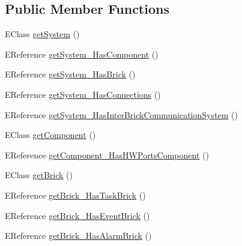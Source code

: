 \subsection*{Public Member Functions}
\begin{DoxyCompactItemize}
\item 
E\-Class \hyperlink{classshootingmachineemfmodel_1_1impl_1_1_shootingmachineemfmodel_package_impl_a79cabfebb9a8de6c66ef4b36772d16d1}{get\-System} ()
\item 
E\-Reference \hyperlink{classshootingmachineemfmodel_1_1impl_1_1_shootingmachineemfmodel_package_impl_abf594d9c3cb58e015ec7c686fb1353d0}{get\-System\-\_\-\-Has\-Component} ()
\item 
E\-Reference \hyperlink{classshootingmachineemfmodel_1_1impl_1_1_shootingmachineemfmodel_package_impl_a43912263acc6e041caa2a89c48404762}{get\-System\-\_\-\-Has\-Brick} ()
\item 
E\-Reference \hyperlink{classshootingmachineemfmodel_1_1impl_1_1_shootingmachineemfmodel_package_impl_a1c55ec69db454f3b2ebe3748aa071ff5}{get\-System\-\_\-\-Has\-Connections} ()
\item 
E\-Reference \hyperlink{classshootingmachineemfmodel_1_1impl_1_1_shootingmachineemfmodel_package_impl_a3cde512cb746cb8a01ad9d0c7d6e73ef}{get\-System\-\_\-\-Has\-Inter\-Brick\-Communication\-System} ()
\item 
E\-Class \hyperlink{classshootingmachineemfmodel_1_1impl_1_1_shootingmachineemfmodel_package_impl_a375240560ab7b64152ec7b4e53a51ee3}{get\-Component} ()
\item 
E\-Reference \hyperlink{classshootingmachineemfmodel_1_1impl_1_1_shootingmachineemfmodel_package_impl_a9d3f7229195ba1c06938f5d64fd0cfcc}{get\-Component\-\_\-\-Has\-H\-W\-Ports\-Component} ()
\item 
E\-Class \hyperlink{classshootingmachineemfmodel_1_1impl_1_1_shootingmachineemfmodel_package_impl_aaef94e2843dca6a355980df230d01339}{get\-Brick} ()
\item 
E\-Reference \hyperlink{classshootingmachineemfmodel_1_1impl_1_1_shootingmachineemfmodel_package_impl_a406625829d84cd66495e4857bfb21c8f}{get\-Brick\-\_\-\-Has\-Task\-Brick} ()
\item 
E\-Reference \hyperlink{classshootingmachineemfmodel_1_1impl_1_1_shootingmachineemfmodel_package_impl_a1f1752b30f3ab194d1a1848802a0e6cd}{get\-Brick\-\_\-\-Has\-Event\-Brick} ()
\item 
E\-Reference \hyperlink{classshootingmachineemfmodel_1_1impl_1_1_shootingmachineemfmodel_package_impl_a67d402c42e0b2d2f1995496ad762daea}{get\-Brick\-\_\-\-Has\-Alarm\-Brick} ()

\end{DoxyCompactItemize}
